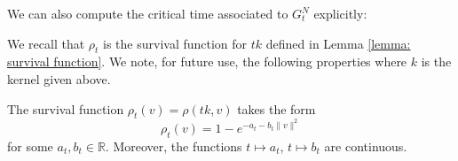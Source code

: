 We can also compute the critical time associated to $G^N_t$ explicitly:
\begin{lemma}\label{lemma: computation of tcrit} \end{lemma}

We recall that $\rho_t$ is the survival function for $tk$ defined in Lemma \ref{lemma: survival function}. We note, for future use, the following properties where $k$ is the kernel given above.
\begin{lemma}\label{lemma: form of rho-t}
    The survival function $\rho_t(v)=\rho(tk,v)$ takes the form \begin{equation}
        \rho_t(v)=1-e^{-a_t-b_t\|v\|^2}
    \end{equation} for some $a_t, b_t \in \mathbb{R}$. Moreover, the functions $t\mapsto a_t$, $t\mapsto b_t$ are continuous. 
\end{lemma}
